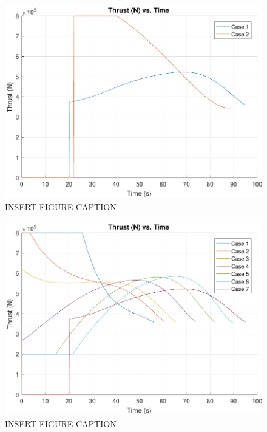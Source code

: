 \begin{figure}[H]
	\centering
	\begin{minipage}{4.5 in}
		\includegraphics[width=\linewidth]{Figures/thratmovsvac.pdf}
		\caption{INSERT FIGURE CAPTION \label{fig:thratmovsvac} }
	\end{minipage}
\end{figure}



\begin{figure}[H]
	\centering
	\begin{minipage}{4.5 in}
		\includegraphics[width=\linewidth]{Figures/thrpowatmo.pdf}
		\caption{INSERT FIGURE CAPTION \label{fig:thrpowatmo} }
	\end{minipage}
\end{figure}











